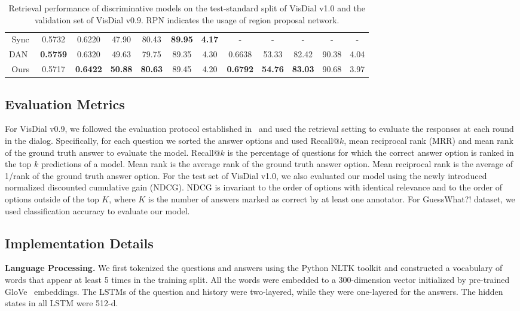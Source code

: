 \documentclass[10pt,twocolumn,letterpaper]{article}
\begin{document}
\begin{table*}
\begin{center}
\begin{tabular}{
cccccccccccc}
Sync\cite{guo2019image} &0.5732  &0.6220  &47.90 &80.43 &\textbf{89.95} &\textbf{4.17}    &- &- &- &- &-  \\
DAN~\cite{kang2019dual}   &\textbf{0.5759} &0.6320 &49.63 &79.75 &89.35 &4.30 &0.6638 &53.33 &82.42 &90.38 &4.04         \\
\midrule  
Ours &0.5717  &\textbf{0.6422}  &\textbf{50.88} &\textbf{80.63} &89.45 &4.20   &\textbf{0.6792} &\textbf{54.76} &\textbf{83.03} &90.68 &3.97                            \\
\bottomrule
\end{tabular}
\end{center}
\caption{Retrieval performance of discriminative models on the test-standard split of VisDial v1.0 and the validation set of VisDial v0.9. RPN indicates the usage of region proposal network.}
\label{table:v1.0test}
\end{table*}

\subsection{Evaluation Metrics}
For VisDial v0.9, we followed the evaluation protocol established in~\cite{das2017visual} and used the retrieval setting to evaluate the responses at each round in the dialog. Specifically, for each question we sorted the answer options and used Recall@$k$, mean reciprocal rank (MRR) and mean rank of the ground truth answer to evaluate the model. Recall@$k$ is the percentage of questions for which the correct answer option is ranked in the top $k$ predictions of a model. Mean rank is the average rank of the ground truth answer option. Mean reciprocal rank is the average of 1/rank of the ground truth answer option. For the test set of VisDial v1.0, we also evaluated our model using the newly introduced normalized discounted cumulative gain (NDCG). NDCG is invariant to the order of options with identical relevance and to the order of options outside of the top $K$, where $K$ is the number of answers marked as correct by at least one annotator. For GuessWhat?! dataset, we used classification accuracy to evaluate our model.

\subsection{Implementation Details}
\noindent\textbf{Language Processing.} We first tokenized the questions and answers using the Python NLTK toolkit and constructed a vocabulary of words that appear at least 5 times in the training split. All the words were embedded to a 300-dimension vector initialized by pre-trained GloVe~\cite{pennington2014glove} embeddings. The LSTMs of the question and history were two-layered, while they were one-layered for the answers. The hidden states in all LSTM were 512-d.
\end{document}
